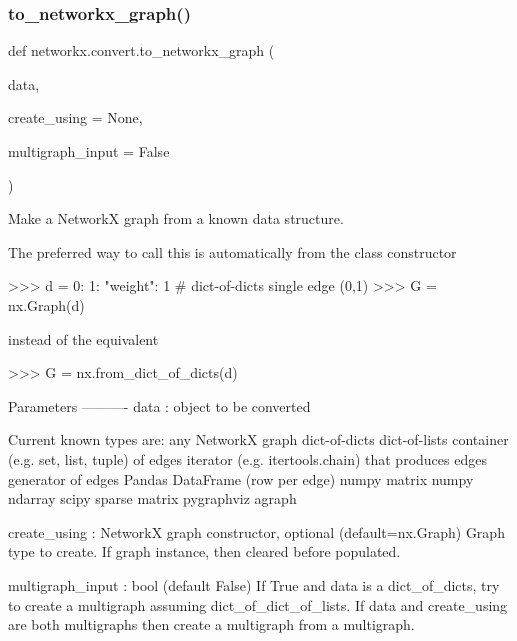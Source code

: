 \subsubsection{\texorpdfstring{to\+\_\+networkx\+\_\+graph()}{to\_networkx\_graph()}}
{\footnotesize\ttfamily def networkx.\+convert.\+to\+\_\+networkx\+\_\+graph (\begin{DoxyParamCaption}\item[{}]{data,  }\item[{}]{create\+\_\+using = {\ttfamily None},  }\item[{}]{multigraph\+\_\+input = {\ttfamily False} }\end{DoxyParamCaption})}

\begin{DoxyVerb}Make a NetworkX graph from a known data structure.

The preferred way to call this is automatically
from the class constructor

>>> d = {0: {1: {"weight": 1}}}  # dict-of-dicts single edge (0,1)
>>> G = nx.Graph(d)

instead of the equivalent

>>> G = nx.from_dict_of_dicts(d)

Parameters
----------
data : object to be converted

    Current known types are:
     any NetworkX graph
     dict-of-dicts
     dict-of-lists
     container (e.g. set, list, tuple) of edges
     iterator (e.g. itertools.chain) that produces edges
     generator of edges
     Pandas DataFrame (row per edge)
     numpy matrix
     numpy ndarray
     scipy sparse matrix
     pygraphviz agraph

create_using : NetworkX graph constructor, optional (default=nx.Graph)
    Graph type to create. If graph instance, then cleared before populated.

multigraph_input : bool (default False)
    If True and  data is a dict_of_dicts,
    try to create a multigraph assuming dict_of_dict_of_lists.
    If data and create_using are both multigraphs then create
    a multigraph from a multigraph.\end{DoxyVerb}
 